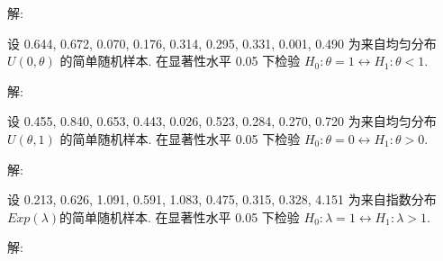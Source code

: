 \documentclass[standard]{ExBook}
\begin{document}
\begin{qitems}
\vspace{-5em}

    \begin{bbox}
解: 
    \end{bbox}

\vspace{-5em}

    \begin{bbox}
    \begin{shaded}
        \qitem
设 0.644, 0.672, 0.070, 0.176, 0.314, 0.295, 0.331, 0.001, 0.490 为来自均匀分布 $U(0,\theta)$ 的简单随机样本. 在显著性水平 0.05 下检验 $H_0 : \theta=1 \longleftrightarrow H_1 : \theta<1$.
    \end{shaded}
    \end{bbox}

\vspace{-5em}

    \begin{bbox}
解: 
    \end{bbox}

\vspace{-5em}

    \begin{bbox}
    \begin{shaded}
        \qitem
设 0.455, 0.840, 0.653, 0.443, 0.026, 0.523, 0.284, 0.270, 0.720 为来自均匀分布 $U(\theta,1)$ 的简单随机样本. 在显著性水平 0.05 下检验 $H_0 : \theta=0 \longleftrightarrow H_1 : \theta > 0$.
    \end{shaded}
    \end{bbox}

\vspace{-5em}

    \begin{bbox}
解: 
    \end{bbox}

\vspace{-5em}

    \begin{bbox}
    \begin{shaded}
        \qitem
设 0.213, 0.626, 1.091, 0.591, 1.083, 0.475, 0.315, 0.328, 4.151 为来自指数分布$Exp(\lambda)$的简单随机样本. 在显著性水平 0.05 下检验 $H_0 : \lambda=1 \longleftrightarrow H_1 : \lambda>1$.
    \end{shaded}
    \end{bbox}

\vspace{-5em}

    \begin{bbox}
解: 
    \end{bbox}


\end{qitems}
\end{document}
